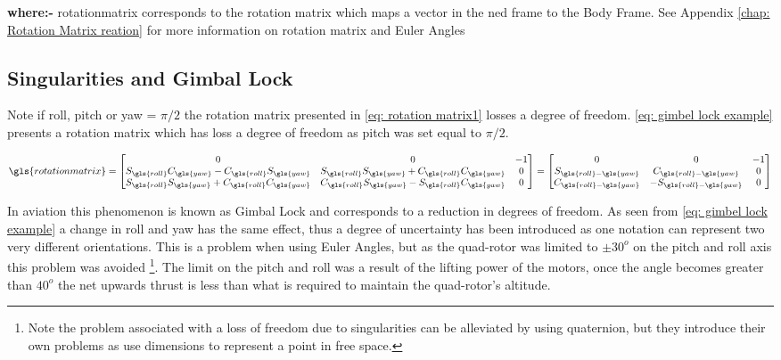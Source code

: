 {\bf where:-} \gls{rotationmatrix} corresponds to the rotation matrix which maps a vector in the \gls{ned} frame to the Body Frame. See Appendix \ref{chap: Rotation Matrix reation} for more information on rotation matrix and Euler Angles



\subsection{Singularities and Gimbal Lock}
Note if \gls{roll}, \gls{pitch} or \gls{yaw} = $\pi/2$ the rotation matrix presented in \eqref{eq: rotation matrix1} losses a degree of freedom. \eqref{eq: gimbel lock example} presents a rotation matrix which has loss a degree of freedom as \gls{pitch} was set equal to $\pi/2$. 

\begin{equation}
	\gls{rotationmatrix} =  \begin{bmatrix}
		0                                                          & 0                                                          & -1 \\
		S_{\gls{roll}}C_{\gls{yaw}}  - C_{\gls{roll}}S_{\gls{yaw}} & S_{\gls{roll}}S_{\gls{yaw}}  + C_{\gls{roll}}C_{\gls{yaw}} & 0  \\
		S_{\gls{roll}}S_{\gls{yaw}}  + C_{\gls{roll}}C_{\gls{yaw}} & C_{\gls{roll}}S_{\gls{yaw}}  - S_{\gls{roll}}C_{\gls{yaw}} & 0
	\end{bmatrix}
	=  \begin{bmatrix}
		0                          & 0                           & -1 \\
		S_{\gls{roll} - \gls{yaw}} & C_{\gls{roll} - \gls{yaw}}  & 0  \\
		C_{\gls{roll} - \gls{yaw}} & -S_{\gls{roll} - \gls{yaw}} & 0
	\end{bmatrix}
	\label{eq: gimbel lock example}
\end{equation}

In aviation this phenomenon is known as Gimbal Lock and corresponds to a reduction in degrees of freedom. As seen from \eqref{eq: gimbel lock example} a change in \gls{roll} and \gls{yaw} has the same effect, thus a degree of uncertainty has been introduced as one notation can represent two very different orientations. This is a problem when using Euler Angles, but as the quad-rotor was limited to $\pm 30^o$ on the \gls{pitch} and \gls{roll} axis this problem was avoided \footnote{Note the problem associated with a loss of freedom due to singularities can be alleviated by using quaternion, but they introduce their own problems as use dimensions to represent a point in free space.}. The limit on the pitch and roll was a result of the lifting power of the motors, once the angle becomes greater than $40 ^o$ the net upwards thrust is less than what is required to maintain the quad-rotor's altitude. 



